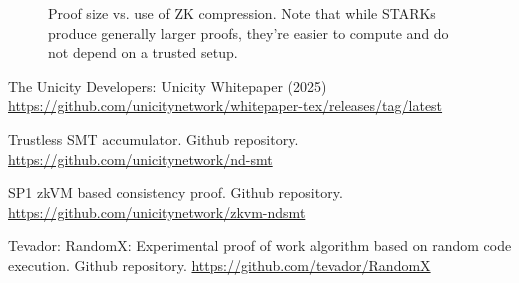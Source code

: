 \documentclass[twocolumn]{article}
\begin{document}
\begin{figure}[!htbp]
    \centering
{}
    \caption{Proof size vs. use of ZK compression. Note that while STARKs produce generally larger proofs, they're easier to compute and do not depend on a trusted setup.}\label{fig:comp}
\end{figure}


\begin{thebibliography}{9}

 The Unicity Developers: Unicity Whitepaper (2025) \url{https://github.com/unicitynetwork/whitepaper-tex/releases/tag/latest}

 Trustless SMT accumulator. Github repository. \url{https://github.com/unicitynetwork/nd-smt}

 SP1 zkVM based consistency proof. Github repository. \url{https://github.com/unicitynetwork/zkvm-ndsmt}

 Tevador: RandomX: Experimental proof of work algorithm based on random code execution. Github repository. \url{https://github.com/tevador/RandomX}

\end{thebibliography}
\end{document}
